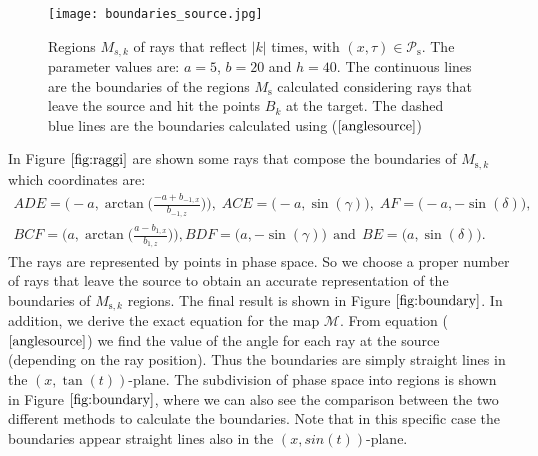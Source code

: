 \begin{figure}[htbp]
\texttt{[image: boundaries\_source.jpg]}
\caption{\footnotesize{Regions $M_{s,k}$ of rays that reflect $|k|$ times, with $(x,\tau)\in\mathcal{P}_\textrm{s}$.
The parameter values are: $a=5$, $b=20$ and $h=40$. The continuous lines are the boundaries of the regions $M_{\textrm{s}}$
calculated considering rays that leave the source and hit the points $B_{k}$ at the target. The dashed blue lines are the boundaries calculated using ($\ref{anglesource}$) }}
\label{fig:boundary}
\end{figure}
In Figure $\ref{fig:raggi}$ are shown some rays that compose the boundaries of $M_{\textrm{s},k}$ which coordinates are:
$$ \begin{array}{cc}ADE = \Bigg(-a, \arctan\Big(\frac{-a+b_{-1,x}}{b_{-1,z}}\Big)\Bigg),\; ACE = \big(-a, \sin(\gamma)\big),\; AF = \big(-a, -\sin(\delta)\big), \\
 BCF = \Bigg(a, \arctan\Big(\frac{a-b_{1,x}}{b_{1,z}}\Big)\Bigg), BDF = \big(a, - \sin(\gamma)\big) \, \;\mbox{and} \,\; BE = \big(a, \sin(\delta)\big).\end{array} $$
The rays are represented by points in phase space.
So we choose a proper number of rays that leave the source to obtain an accurate representation of the boundaries of  $M_{\textrm{s},k}$ regions.
The final result is shown in Figure $\ref{fig:boundary}$.
In addition, we derive the exact equation for the map $\mathcal{M}$.
From equation ($\ref{anglesource}$) we find the value of the angle for each ray at the source (depending on the ray position).
Thus the boundaries are simply straight lines in the $(x, \tan(t))$-plane. The subdivision of phase space into regions is shown in Figure
$\ref{fig:boundary}$, where we can also see the comparison between the two different methods to calculate the boundaries. Note that in this specific case the boundaries appear straight lines also in the $(x,sin(t))$-plane.
